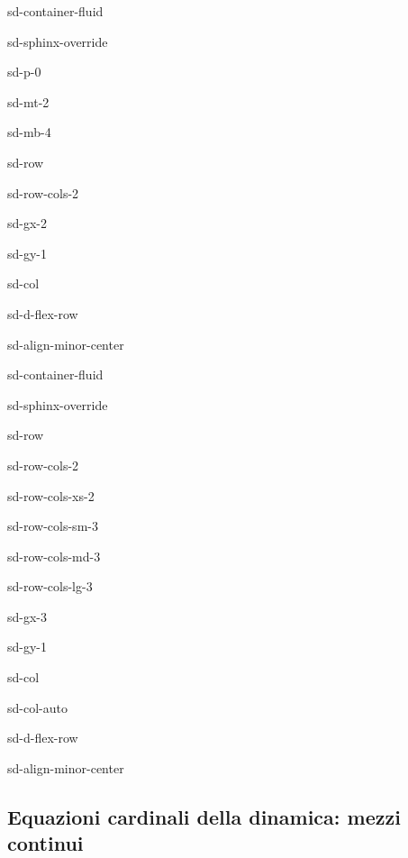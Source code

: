 \documentclass[letterpaper,10pt,english]{jupyterBook}
\begin{document}
\begin{sphinxuseclass}{sd-container-fluid}
\begin{sphinxuseclass}{sd-sphinx-override}
\begin{sphinxuseclass}{sd-p-0}
\begin{sphinxuseclass}{sd-mt-2}
\begin{sphinxuseclass}{sd-mb-4}
\begin{sphinxuseclass}{sd-row}
\begin{sphinxuseclass}{sd-row-cols-2}
\begin{sphinxuseclass}{sd-gx-2}
\begin{sphinxuseclass}{sd-gy-1}
\begin{sphinxuseclass}{sd-col}
\begin{sphinxuseclass}{sd-d-flex-row}
\begin{sphinxuseclass}{sd-align-minor-center}
\begin{sphinxuseclass}{sd-container-fluid}
\begin{sphinxuseclass}{sd-sphinx-override}
\begin{sphinxuseclass}{sd-row}
\begin{sphinxuseclass}{sd-row-cols-2}
\begin{sphinxuseclass}{sd-row-cols-xs-2}
\begin{sphinxuseclass}{sd-row-cols-sm-3}
\begin{sphinxuseclass}{sd-row-cols-md-3}
\begin{sphinxuseclass}{sd-row-cols-lg-3}
\begin{sphinxuseclass}{sd-gx-3}
\begin{sphinxuseclass}{sd-gy-1}
\begin{sphinxuseclass}{sd-col}
\begin{sphinxuseclass}{sd-col-auto}
\begin{sphinxuseclass}{sd-d-flex-row}
\begin{sphinxuseclass}{sd-align-minor-center}
\end{sphinxuseclass}
\end{sphinxuseclass}
\end{sphinxuseclass}
\end{sphinxuseclass}
\end{sphinxuseclass}
\end{sphinxuseclass}
\end{sphinxuseclass}
\end{sphinxuseclass}
\end{sphinxuseclass}
\end{sphinxuseclass}
\end{sphinxuseclass}
\end{sphinxuseclass}
\end{sphinxuseclass}
\end{sphinxuseclass}
\end{sphinxuseclass}
\end{sphinxuseclass}
\end{sphinxuseclass}
\end{sphinxuseclass}
\end{sphinxuseclass}
\end{sphinxuseclass}
\end{sphinxuseclass}
\end{sphinxuseclass}
\end{sphinxuseclass}
\end{sphinxuseclass}
\end{sphinxuseclass}
\end{sphinxuseclass}

\subsection{Equazioni cardinali della dinamica: mezzi continui}
\label{\detokenize{ch/dynamics-eom-continuum:equazioni-cardinali-della-dinamica-mezzi-continui}}\label{\detokenize{ch/dynamics-eom-continuum:classical-mechanics-dynamics-eom-continuum}}\label{\detokenize{ch/dynamics-eom-continuum::doc}}
\sphinxstepscope
\end{document}

